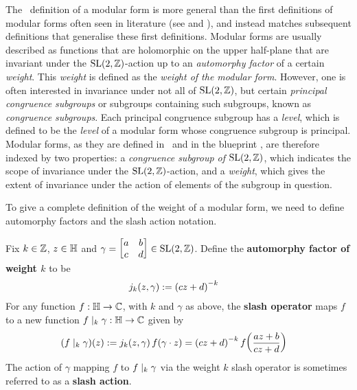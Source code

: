 The \mathlib\ definition of a modular form is more general than the first definitions of modular forms often seen in literature (see \cite[Chapter VII, \S 2, Definition 4]{SerreArith} and \cite[Definition 1.1.2]{DiamondShurman}), and instead matches subsequent definitions that generalise these first definitions. Modular forms are usually described as functions that are holomorphic on the upper half-plane that are invariant under the $\operatorname{SL}\!\left( 2, \mathbb{Z} \right)$-action up to an \textit{automorphy factor} of a certain \textit{weight}. This \textit{weight} is defined as the \textit{weight of the modular form}. However, one is often interested in invariance under not all of $\operatorname{SL}\!\left( 2, \mathbb{Z} \right)$, but certain \textit{principal congruence subgroups} or subgroups containing such subgroups, known as \textit{congruence subgroups}. Each principal congruence subgroup has a \textit{level}, which is defined to be the \textit{level} of a modular form whose congruence subgroup is principal. Modular forms, as they are defined in \mathlib\ and in the blueprint \cite{blueprint}, are therefore indexed by two properties: a \textit{congruence subgroup of $\operatorname{SL}\!\left( 2, \mathbb{Z} \right)$}, which indicates the scope of invariance under the $\operatorname{SL}\!\left( 2, \mathbb{Z} \right)$-action, and a \textit{weight}, which gives the extent of invariance under the action of elements of the subgroup in question.

To give a complete definition of the weight of a modular form, we need to define automorphy factors and the slash action notation.

\begin{boxdefinition}\label{Ch2:Def:Aut_Factor_Slash_Action}
    Fix $k \in \mathbb{Z}$, $z \in \mathbb{H}$ and $\gamma = \begin{bmatrix} a & b \\ c & d \end{bmatrix} \in \operatorname{SL}\!\left( 2, \mathbb{Z} \right)$. Define the \textbf{automorphy factor of weight $k$} to be
    \begin{align}
        j_k\!\left( z, \gamma \right) &:= \left( cz + d \right)^{-k}
        \label{Ch2:Eq:AutomorphyFactor_def}
    \end{align}
    For any function $f : \mathbb{H} \to \mathbb{C}$, with $k$ and $\gamma$ as above, the \textbf{slash operator} maps $f$ to a new function $f \mid_k \gamma : \mathbb{H} \to \mathbb{C}$ given by
    \begin{align}
        \left( f \mid_{k} {\gamma} \right)\!\left( z \right) &:= j_k\!\left( z, \gamma \right) f\!\left( \gamma \cdot z \right) = \left( cz + d \right)^{-k} f\!\left( \frac{az + b}{cz + d} \right)
        \label{Ch2:Eq:SlashAction_def}
    \end{align}
    The action of $\gamma$ mapping $f$ to $f \mid_k \gamma$ via the weight $k$ slash operator is sometimes referred to as a \textbf{slash action}.
\end{boxdefinition}

